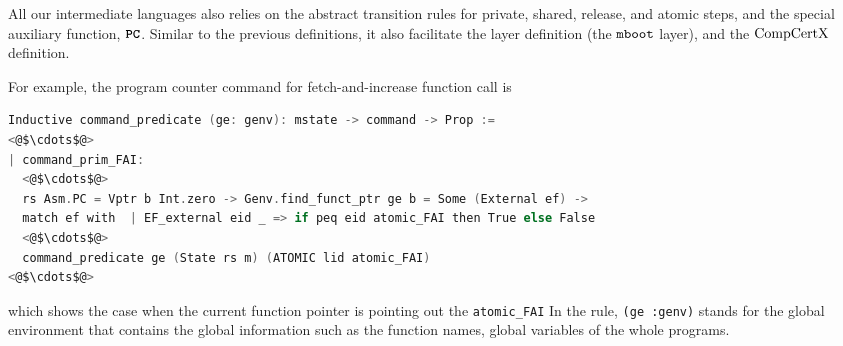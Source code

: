 %

All our intermediate languages 
also relies on the abstract transition rules for 
private, shared, release, and atomic steps, and the special auxiliary function, ${{\mathrm{\texttt{\textbf{PC}}}}}$.
Similar to the previous definitions, 
it also facilitate the layer definition (the ${\mathrm{\texttt{mboot}}}$ layer), 
and the $\mathrm{CompCertX}$ definition.

For example, the program counter command
for fetch-and-increase function call is
\begin{lstlisting}[language=C]
Inductive command_predicate (ge: genv): mstate -> command -> Prop :=
<@$\cdots$@>
| command_prim_FAI:
  <@$\cdots$@>
  rs Asm.PC = Vptr b Int.zero -> Genv.find_funct_ptr ge b = Some (External ef) ->
  match ef with  | EF_external eid _ => if peq eid atomic_FAI then True else False
  <@$\cdots$@>
  command_predicate ge (State rs m) (ATOMIC lid atomic_FAI)
<@$\cdots$@>
\end{lstlisting}
which shows the case when the current function pointer is pointing out the \lstinline$atomic_FAI$
In the rule, \lstinline$(ge :genv)$ stands for the global environment that contains the 
global information such as the function names, global variables of the whole programs.

